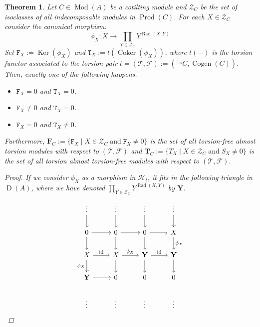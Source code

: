 \documentclass[12pt]{amsart}
\numberwithin{equation}{section}
\newtheorem{theorem}[lemma]{Theorem}
\theoremstyle{definition}
\DeclareMathOperator{\Mod}{Mod}
\DeclareMathOperator{\id}{id}
\DeclareMathOperator{\Ker}{Ker}
\DeclareMathOperator{\Coker}{Coker}
\DeclareMathOperator{\Cogen}{Cogen}
\DeclareMathOperator{\D}{D}
\DeclareMathOperator{\Prod}{Prod}
\DeclareMathOperator{\Rad}{Rad}
\newtheorem*{theorem 0*}{Theorem}
\newtheorem*{theorem a*}{Theorem A}
\newtheorem*{theorem b*}{Theorem B}
\numberwithin{diagram}{section}
\begin{document}
\begin{theorem}\label{3.6}
Let $C\in \Mod(A)$ be a cotilting module and $\mathcal{Z}_C$ be the set of isoclasses of all indecomposable modules in $\Prod(C)$. For each $X\in\mathcal{Z}_C$ consider the canonical morphism.
\begin{equation}
\phi_X:X\longrightarrow \prod_{Y\in\mathcal{Z}_C}Y^{\Rad(X,Y)}
\end{equation}
Set $\mathtt{F}_X:=\Ker(\phi_X)$ and $\mathtt{T}_X:=t(\Coker(\phi_X))$, where $t(-)$ is the torsion functor associated to the torsion pair $t=(\mathcal{T},\mathcal{F}):=({}^{\bot_0}C,\Cogen(C))$.
Then, exactly one of the following happens.
	\begin{itemize}
	\item[(1)]
    $\mathtt{F}_X=0$ and $\mathtt{T}_X=0$.
	\item[(2)]
    $\mathtt{F}_X\neq 0$ and $\mathtt{T}_X=0$.
	\item[(3)]
	$\mathtt{F}_X=0$ and $\mathtt{T}_X\neq 0$.
	\end{itemize}
Furthermore, $\mathbf{F}_C:=\{\mathtt{F}_X\mid X\in\mathcal{Z}_C\; \text{and}\; \mathtt{F}_X\neq 0\}$ is the set of all torsion-free almost torsion modules with respect to $(\mathcal{T},\mathcal{F})$ and $\mathbf{T}_C:=\{T_X\mid X\in\mathcal{Z}_C\; \text{and}\; S_X\neq 0\}$ is the set of all torsion almost torsion-free modules with respect to $(\mathcal{T},\mathcal{F})$. 
	 \begin{proof}
If we consider $\phi_X$ as a morphism in $\mathcal{H}_t$, it fits in the following triangle in $\D(A)$, where we have denoted $\prod_{Y\in\mathcal{Z}_C}Y^{\Rad(X,Y)}$ by $\textbf{Y}$.
	\[\begin{tikzcd}
	\vdots & \vdots & \vdots & \vdots \\
	0 & 0 & 0 & X \\
	X & X & {\textbf{Y}} & {\textbf{Y}} \\
	{\textbf{Y}} & 0 & 0 & 0 \\
	\vdots & \vdots & \vdots & \vdots
	\arrow[from=1-1, to=2-1]
	\arrow[from=1-2, to=2-2]
	\arrow[from=1-3, to=2-3]
	\arrow[from=1-4, to=2-4]
	\arrow[from=2-1, to=2-2]
	\arrow[from=2-1, to=3-1]
	\arrow[from=2-2, to=2-3]
	\arrow[from=2-2, to=3-2]
	\arrow[from=2-3, to=2-4]
	\arrow[from=2-3, to=3-3]
	\arrow["{\phi_X}", from=2-4, to=3-4]
	\arrow["\id", from=3-1, to=3-2]
	\arrow["{\phi_X}"', from=3-1, to=4-1]
	\arrow["{\phi_X}", from=3-2, to=3-3]
	\arrow[from=3-2, to=4-2]
	\arrow["\id", from=3-3, to=3-4]
	\arrow[from=3-3, to=4-3]
	\arrow[from=3-4, to=4-4]
	\arrow[from=4-1, to=4-2]

\end{tikzcd}\]
\end{proof}
\end{theorem}
\end{document}
